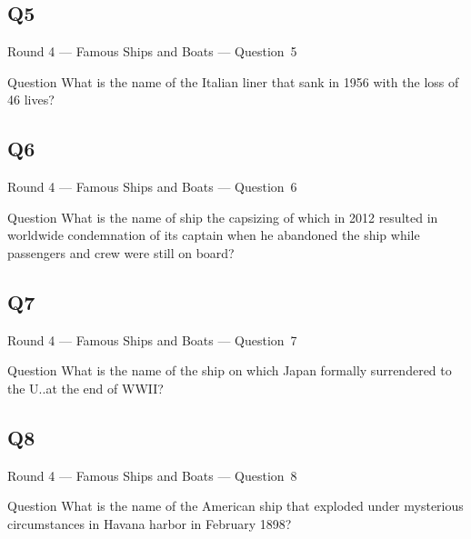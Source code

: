 \documentclass[11pt]{beamer}
\begin{document}
\subsection*{Q5}
\begin{frame}[t]{Round 4 --- Famous Ships and Boats --- \mbox{Question 5}}
    \vspace{-0.5em}
    \begin{block}{Question}
        What is the name of the Italian liner that sank in 1956 with the loss of 46 lives?
    \end{block}
\end{frame}
\subsection*{Q6}
\begin{frame}[t]{Round 4 --- Famous Ships and Boats --- \mbox{Question 6}}
    \vspace{-0.5em}
    \begin{block}{Question}
        What is the name of ship the capsizing of which in  2012 resulted in worldwide condemnation of its captain when he abandoned the ship while passengers and crew were still on board?
    \end{block}
\end{frame}
\subsection*{Q7}
\begin{frame}[t]{Round 4 --- Famous Ships and Boats --- \mbox{Question 7}}
    \vspace{-0.5em}
    \begin{block}{Question}
        What is the name of the ship on which Japan formally surrendered to the U.\@S.\@ at the end of WWII\@?
    \end{block}
\end{frame}
\subsection*{Q8}
\begin{frame}[t]{Round 4 --- Famous Ships and Boats --- \mbox{Question 8}}
    \vspace{-0.5em}
    \begin{block}{Question}
        What is the name of the  American ship that exploded under mysterious circumstances in Havana harbor in February 1898?
    \end{block}
\end{frame}
\end{document}
